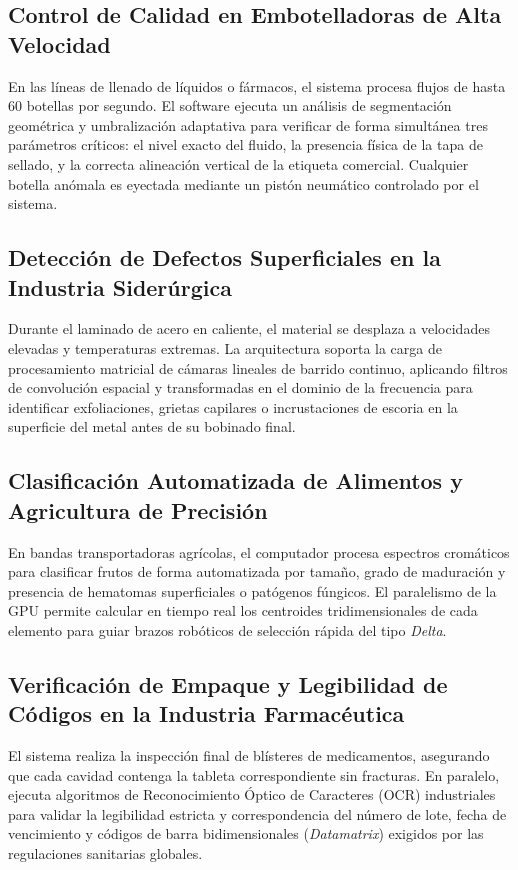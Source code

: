 \documentclass[12pt,letterpaper]{article}
\begin{document}
\subsection{Control de Calidad en Embotelladoras de Alta Velocidad}
En las líneas de llenado de líquidos o fármacos, el sistema procesa flujos de hasta 60 botellas por segundo. El software ejecuta un análisis de segmentación geométrica y umbralización adaptativa para verificar de forma simultánea tres parámetros críticos: el nivel exacto del fluido, la presencia física de la tapa de sellado, y la correcta alineación vertical de la etiqueta comercial. Cualquier botella anómala es eyectada mediante un pistón neumático controlado por el sistema.

\subsection{Detección de Defectos Superficiales en la Industria Siderúrgica}
Durante el laminado de acero en caliente, el material se desplaza a velocidades elevadas y temperaturas extremas. La arquitectura soporta la carga de procesamiento matricial de cámaras lineales de barrido continuo, aplicando filtros de convolución espacial y transformadas en el dominio de la frecuencia para identificar exfoliaciones, grietas capilares o incrustaciones de escoria en la superficie del metal antes de su bobinado final.

\subsection{Clasificación Automatizada de Alimentos y Agricultura de Precisión}
En bandas transportadoras agrícolas, el computador procesa espectros cromáticos para clasificar frutos de forma automatizada por tamaño, grado de maduración y presencia de hematomas superficiales o patógenos fúngicos. El paralelismo de la GPU permite calcular en tiempo real los centroides tridimensionales de cada elemento para guiar brazos robóticos de selección rápida del tipo \textit{Delta}.

\subsection{Verificación de Empaque y Legibilidad de Códigos en la Industria Farmacéutica}
El sistema realiza la inspección final de blísteres de medicamentos, asegurando que cada cavidad contenga la tableta correspondiente sin fracturas. En paralelo, ejecuta algoritmos de Reconocimiento Óptico de Caracteres (OCR) industriales para validar la legibilidad estricta y correspondencia del número de lote, fecha de vencimiento y códigos de barra bidimensionales (\textit{Datamatrix}) exigidos por las regulaciones sanitarias globales.
\end{document}
